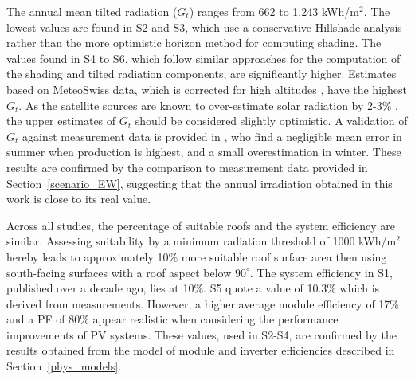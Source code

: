 The annual mean tilted radiation ($G_t$) ranges from 662 to 1,243 kWh/m$^2$. The lowest values are found in S2 and S3, which use a conservative Hillshade analysis rather than the more optimistic horizon method for computing shading. 
The values found in S4 to S6, which follow similar approaches for the computation of the shading and tilted radiation components, are significantly higher.
Estimates based on MeteoSwiss data, which is corrected for high altitudes \cite{buffat_scalable_2018}, have the highest $G_t$. As the satellite sources are known to over-estimate solar radiation by 2-3\% \cite{klauser_solarpotentialanalyse_2016}, the upper estimates of $G_t$ should be considered slightly optimistic.
A validation of $G_t$ against measurement data is provided in \cite{buffat_scalable_2018}, who find a negligible mean error in summer when production is highest, and a small overestimation in winter. 
These results are confirmed by the comparison to measurement data provided in Section~\ref{scenario_EW}, suggesting that the annual irradiation obtained in this work is close to its real value. 

Across all studies, the percentage of suitable roofs and the system efficiency are similar.
Assessing suitability by a minimum radiation threshold of 1000 kWh/m$^2$ hereby leads to approximately 10\% more suitable roof surface area then using south-facing surfaces with a roof aspect below $90^\circ$. 
The system efficiency in S1, published over a decade ago, lies at 10\%. S5 quote a value of 10.3\% which is derived from measurements. However, a higher average module efficiency of 17\% and a PF of 80\% appear realistic when considering the performance improvements of PV systems. These values, used in S2-S4, are confirmed by the results obtained from the model of module and inverter efficiencies described in Section~\ref{phys_models}.

